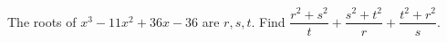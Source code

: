 The roots of $x^3-11x^2+36x-36$ are $r,s,t$. Find $\dfrac{r^2+s^2}{t}+\dfrac{s^2+t^2}{r}+\dfrac{t^2+r^2}{s}$.
